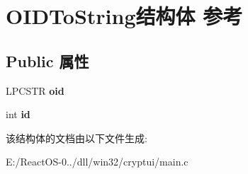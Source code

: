 \hypertarget{struct_o_i_d_to_string}{}\section{O\+I\+D\+To\+String结构体 参考}
\label{struct_o_i_d_to_string}
\subsection*{Public 属性}
\begin{DoxyCompactItemize}
\item 
\mbox{\label{struct_o_i_d_to_string_acb426352ba9989d03f560ea6fac452d9}} 
L\+P\+C\+S\+TR {\bfseries oid}
\item 
\mbox{\label{struct_o_i_d_to_string_a16ee184c9cab075c6e36d59f6743e81d}} 
int {\bfseries id}
\end{DoxyCompactItemize}


该结构体的文档由以下文件生成\+:\begin{DoxyCompactItemize}
\item 
E\+:/\+React\+O\+S-\/0../dll/win32/cryptui/main.\+c\end{DoxyCompactItemize}

